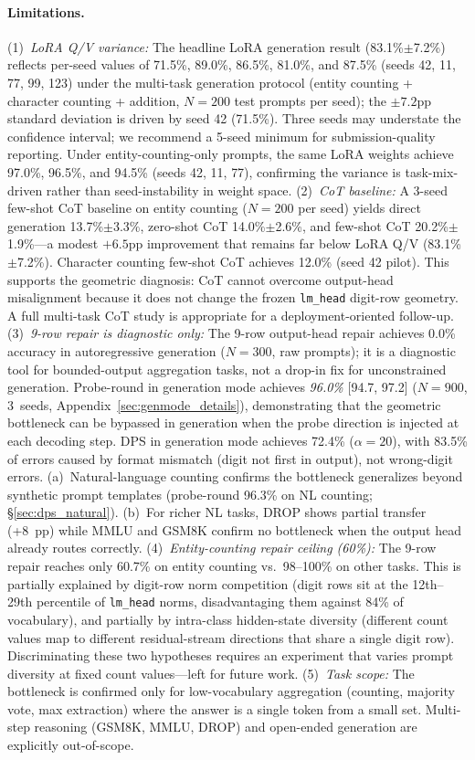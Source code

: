 \documentclass{article}
\begin{document}
\paragraph{Limitations.}
(1)~\emph{LoRA Q/V variance:} The headline LoRA generation result (83.1\%$\pm$7.2\%)
reflects per-seed values of 71.5\%, 89.0\%, 86.5\%, 81.0\%, and 87.5\% (seeds 42, 11, 77, 99, 123) under the
multi-task generation protocol (entity counting + character counting + addition, $N{=}200$ test prompts per seed); the $\pm7.2$pp standard deviation is
driven by seed 42 (71.5\%). Three seeds may understate the confidence interval;
we recommend a 5-seed minimum for submission-quality reporting.
Under entity-counting-only prompts, the same LoRA weights achieve 97.0\%, 96.5\%,
and 94.5\% (seeds 42, 11, 77), confirming the variance is task-mix-driven rather
than seed-instability in weight space.
(2)~\emph{CoT baseline:} A 3-seed few-shot CoT baseline on entity counting ($N{=}200$ per seed) yields
direct generation 13.7\%$\pm$3.3\%, zero-shot CoT 14.0\%$\pm$2.6\%, and few-shot CoT
20.2\%$\pm$1.9\%---a modest $+6.5$pp improvement that remains far below LoRA Q/V (83.1\%$\pm$7.2\%).
Character counting few-shot CoT achieves 12.0\% (seed 42 pilot). This supports the geometric
diagnosis: CoT cannot overcome output-head misalignment because it does not change the
frozen \texttt{lm\_head} digit-row geometry.
A full multi-task CoT study is appropriate for a deployment-oriented follow-up.
(3)~\emph{9-row repair is diagnostic only:} The 9-row output-head repair achieves
0.0\% accuracy in autoregressive generation ($N{=}300$, raw prompts); it is a
diagnostic tool for bounded-output aggregation tasks, not a drop-in fix for unconstrained
generation. Probe-round in generation mode achieves \emph{96.0\%} [94.7, 97.2]
($N{=}900$, 3~seeds, Appendix~\ref{sec:genmode_details}), demonstrating that the geometric
bottleneck can be bypassed in generation when the probe direction is injected at each
decoding step. DPS in generation mode achieves 72.4\% ($\alpha{=}20$), with 83.5\% of
errors caused by format mismatch (digit not first in output), not wrong-digit errors.
(a)~Natural-language counting confirms the bottleneck generalizes beyond synthetic
prompt templates (probe-round 96.3\% on NL counting; \S\ref{sec:dps_natural}).
(b)~For richer NL tasks, DROP shows partial transfer (+8~pp) while MMLU and
GSM8K confirm no bottleneck when the output head already routes correctly.
(4)~\emph{Entity-counting repair ceiling (60\%):} The 9-row repair reaches only 60.7\% on entity counting vs.\ 98--100\% on other tasks. This is partially explained by digit-row norm competition (digit rows sit at the 12th--29th percentile of \texttt{lm\_head} norms, disadvantaging them against 84\% of vocabulary), and partially by intra-class hidden-state diversity (different count values map to different residual-stream directions that share a single digit row). Discriminating these two hypotheses requires an experiment that varies prompt diversity at fixed count values---left for future work.
(5)~\emph{Task scope:} The bottleneck is confirmed only for low-vocabulary aggregation (counting, majority vote, max extraction) where the answer is a single token from a small set. Multi-step reasoning (GSM8K, MMLU, DROP) and open-ended generation are explicitly out-of-scope.
\end{document}
